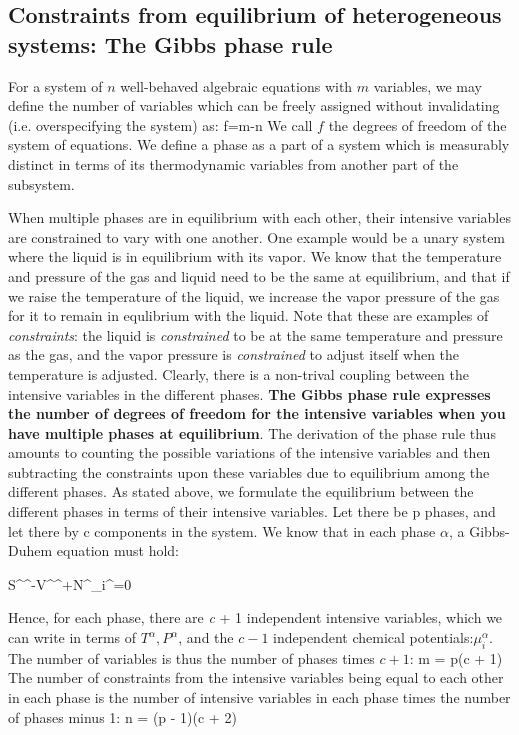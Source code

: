 \documentclass[12pt]{article}
\begin{document}
\subsection{Constraints from equilibrium of heterogeneous systems: The Gibbs phase rule} \label{phaseRule}
For a system of $n$ well-behaved algebraic equations with $m$ variables, we may define the number of variables which can be freely assigned without invalidating (i.e. overspecifying the system) as:
\eqs f=m-n \eqe
We call $f$ the degrees of freedom of the system of equations. We define a phase as a part of a system which is measurably distinct in terms of its thermodynamic variables from another part of the subsystem.

When multiple phases are in equilibrium with each other, their intensive variables are constrained to vary with one another. One example would be a unary system where the liquid is in equilibrium with its vapor. We know that the temperature and pressure of the gas and liquid need to be the same at equilibrium, and that if we raise the temperature of the liquid, we increase the vapor pressure of the gas for it to remain in equlibrium with the liquid. Note that these are examples of \emph{constraints}: the liquid is \emph{constrained} to be at the same temperature and pressure as the gas, and the vapor pressure is \emph{constrained} to adjust itself when the temperature is adjusted. Clearly, there is a non-trival coupling between the intensive variables in the different phases. \textbf{The Gibbs phase rule expresses the number of degrees of freedom for the intensive variables when you have multiple phases at equilibrium}. The derivation of the phase rule thus amounts to counting the possible variations of the intensive variables and then subtracting the constraints upon these variables due to equilibrium among the different phases.
As stated above, we formulate the equilibrium between the different phases in terms of their intensive variables. Let there be p phases, and let there by c components in the system. We know that in each phase $\alpha$, a Gibbs-Duhem equation must hold:

\eqs
S^{\alpha }^{\alpha }-V^{\alpha }^{\alpha }+N^{\alpha }_i^{\alpha }=0\eqe

Hence, for each phase, there are \textit{ c} + 1 independent intensive variables, which we can write in terms of $T^{\alpha },P^{\alpha }$, and the $c-1$ independent chemical potentials:$\mu _i^{\alpha}$. The number of variables is thus the number of phases times $c + 1$: 
\eqs m = p(c + 1) \eqe
The number of constraints from the intensive variables being equal to each other in each phase is the number of intensive variables in each phase
times the number of phases minus 1:
\eqs n = (p - 1)(c + 2) \eqe
\end{document}
